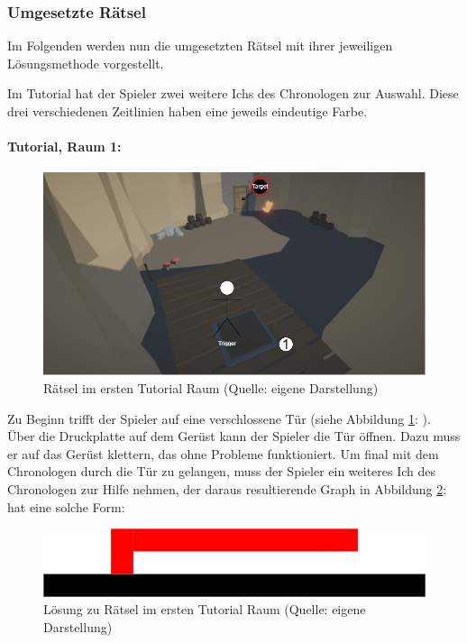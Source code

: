 \subsubsection{Umgesetzte Rätsel}
Im Folgenden werden nun die umgesetzten Rätsel mit ihrer jeweiligen Lösungsmethode vorgestellt. 

Im Tutorial hat der Spieler zwei weitere Ichs des Chronologen zur Auswahl. Diese drei verschiedenen Zeitlinien haben eine jeweils eindeutige Farbe.

\paragraph{Tutorial, Raum 1:}

\begin{figure}[ht]
\centering
\includegraphics[width=0.8\linewidth]{content/pictures/Raetsel-L01_R01_R01.jpg}
\caption{Rätsel im ersten Tutorial Raum (Quelle: eigene Darstellung)}
\label{fig:L01_R01_R01}
\end{figure}

Zu Beginn trifft der Spieler auf eine verschlossene Tür (siehe Abbildung \ref{fig:L01_R01_R01}: ). Über die Druckplatte auf dem Gerüst kann der Spieler die Tür öffnen. Dazu muss er auf das Gerüst klettern, das ohne Probleme funktioniert. Um final mit dem Chronologen durch die Tür zu gelangen, muss der Spieler ein weiteres Ich des Chronologen zur Hilfe nehmen, der daraus resultierende Graph in Abbildung \ref{fig:L01_R01_R01_L}:  hat eine solche Form:

\begin{figure}[ht]
\centering
\includegraphics[width=0.8\linewidth]{content/pictures/Raetsel-L01_R01_R01_Loesung.jpg}
\caption{Lösung zu Rätsel im ersten Tutorial Raum (Quelle: eigene Darstellung)}
\label{fig:L01_R01_R01_L}
\end{figure}

